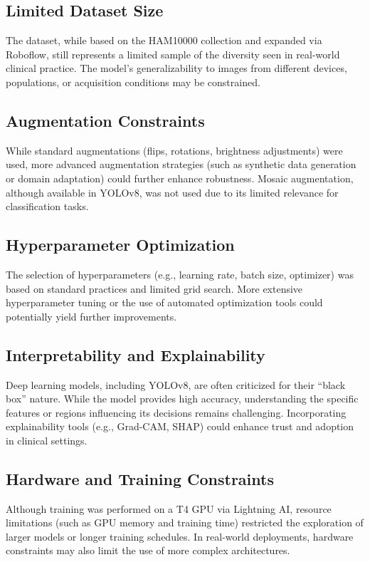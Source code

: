 \documentclass[a4paper,12pt]{report}
\begin{document}
\begin{spacing}{1.5}
        \subsection*{Limited Dataset Size}
        The dataset, while based on the HAM10000 collection and expanded via Roboflow, still represents a limited sample of the diversity seen in real-world clinical practice. The model’s generalizability to images from different devices, populations, or acquisition conditions may be constrained.
        
        \subsection*{Augmentation Constraints}
        While standard augmentations (flips, rotations, brightness adjustments) were used, more advanced augmentation strategies (such as synthetic data generation or domain adaptation) could further enhance robustness. Mosaic augmentation, although available in YOLOv8, was not used due to its limited relevance for classification tasks.
        
        \subsection*{Hyperparameter Optimization}
        The selection of hyperparameters (e.g., learning rate, batch size, optimizer) was based on standard practices and limited grid search. More extensive hyperparameter tuning or the use of automated optimization tools could potentially yield further improvements.
        
        \subsection*{Interpretability and Explainability}
        Deep learning models, including YOLOv8, are often criticized for their “black box” nature. While the model provides high accuracy, understanding the specific features or regions influencing its decisions remains challenging. Incorporating explainability tools (e.g., Grad-CAM, SHAP) could enhance trust and adoption in clinical settings.
        
        \subsection*{Hardware and Training Constraints}
        Although training was performed on a T4 GPU via Lightning AI, resource limitations (such as GPU memory and training time) restricted the exploration of larger models or longer training schedules. In real-world deployments, hardware constraints may also limit the use of more complex architectures.
        

\end{spacing}
\end{document}
